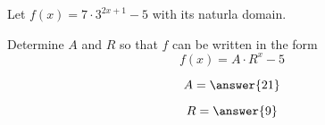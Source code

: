 \documentclass{ximera}
\author{Lee Wayand}
\begin{document}
\begin{exercise}




Let $f(x) = 7 \cdot 3^{2x+1} -5$ with its naturla domain.


\begin{question}


Determine $A$ and $R$ so that $f$ can be written in the form 
\[
f(x) = A \cdot R^x - 5
\]



\[
A = \answer{21}
\]


\[
R = \answer{9}
\]


\end{question}















\end{exercise}
\end{document}
